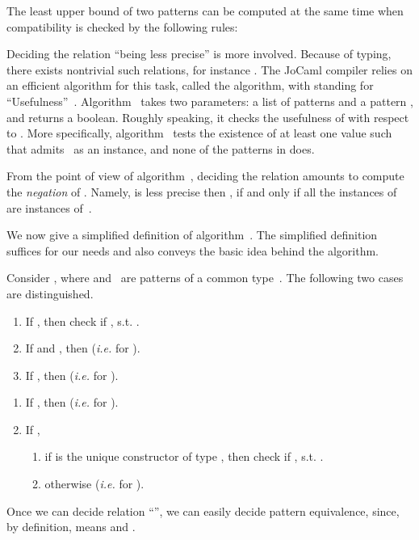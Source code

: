 \documentclass{LMCS}
\makeatletter
\newcommand{\ie}{\emph{i.e.}\@\xspace}
\newcommand{\jocaml}{\textrm{JoCaml}\xspace}
\renewcommand{\_}{\mathord{\rule[-.25ex]{1ex}{.15ex}}}
\makeatother
\begin{document}
The least upper bound of two patterns can be computed at the same time
when compatibility is checked by the following rules: 

Deciding the relation ``being less precise'' is more involved. Because
of typing, there exists nontrivial such relations, for instance
.  The \jocaml compiler relies on an
efficient algorithm for this task, called the  algorithm,
with  standing for ``Usefulness''~\cite{warning}.
Algorithm~ takes two parameters: a list of patterns
 and a pattern , and returns a boolean. Roughly speaking, it
checks the usefulness of  with respect to . More
specifically, algorithm~ tests the existence of at least
one value  such that  admits~ as an instance, and none of
the patterns in  does.

From the point of view of algorithm~, deciding
the relation  amounts
to compute the \emph{negation} of .
Namely,  is less precise then , if and only if
all the instances of~ are instances of~.

We now give a simplified definition of algorithm~.
The simplified definition suffices for our needs and also conveys the
basic idea behind the algorithm.

Consider , where
 and~ are patterns of a common type~.
The following two cases are distinguished.\medskip

   \hfill
  \begin{enumerate}[]
  \item If , then check if
    , s.t.
    .
  \item If  and , then  (\ie  for
    ).
  \item If , then  (\ie  for
    ).
  \end{enumerate}\medskip

   \hfill
  \begin{enumerate}[]
  \item If , then  (\ie  for
    ).
  \item If ,
    \begin{enumerate}[]
    \item if  is the unique constructor of type , then
      check if , s.t.
      .
    \item otherwise  (\ie  for
      ).
    \end{enumerate}
  \end{enumerate}\medskip


\noindent Once we can decide relation ``'', we can easily
decide pattern equivalence, since, by definition, 
means  and .
\end{document}
